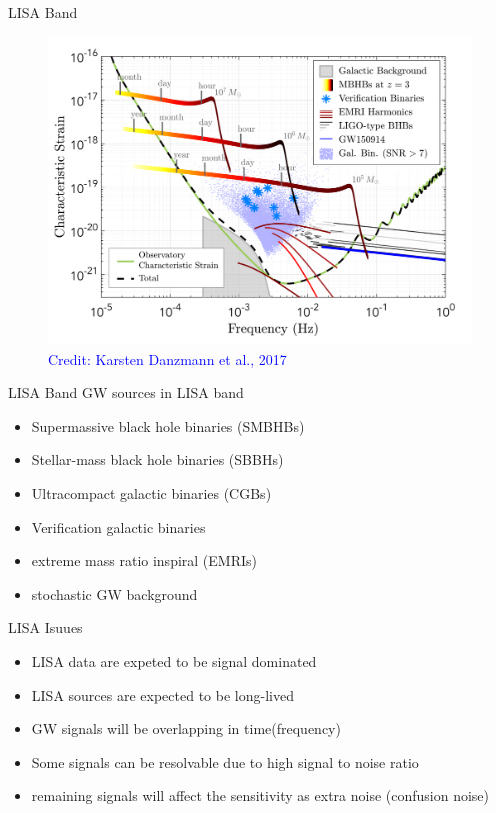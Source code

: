 \documentclass[pdf]{beamer}
\newcommand{\credit}[1]{\tiny{\textcolor{blue}{Credit: #1}}}
\begin{document}
\begin{frame}{LISA Band}
\begin{figure}
\includegraphics[scale=.2]{fig/observedLISA.png}
\caption*{\credit{Karsten Danzmann et al., 2017}}
\end{figure}
\end{frame}

\begin{frame}{LISA Band}
GW sources in LISA band
\begin{itemize}
\item Supermassive black hole binaries (SMBHBs)
\item Stellar-mass black hole binaries (SBBHs)
\item Ultracompact galactic binaries (CGBs)
\item Verification galactic binaries
\item extreme mass ratio inspiral (EMRIs)
\item stochastic GW background 
\end{itemize}
\end{frame}

\begin{frame}{LISA Isuues}
\begin{itemize}
\item LISA data are expeted to be signal dominated
\item LISA sources are expected to be long-lived
\item GW signals will be overlapping in time(frequency)
\pause
\item Some signals can be resolvable due to high signal to noise ratio
\pause
\item remaining signals will affect the sensitivity as extra noise (confusion noise)
\end{itemize}
\end{frame}
\end{document}
